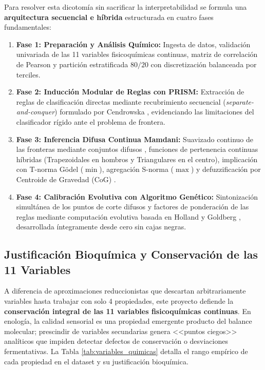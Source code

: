 \documentclass{article}
\begin{document}
Para resolver esta dicotomía sin sacrificar la interpretabilidad se formula una \textbf{arquitectura secuencial e híbrida} estructurada en cuatro fases fundamentales:
\begin{enumerate}
    \item \textbf{Fase 1: Preparación y Análisis Químico:} Ingesta de datos, validación univariada de las 11 variables fisicoquímicas continuas, matriz de correlación de Pearson y partición estratificada $80/20$ con discretización balanceada por terciles.
    \item \textbf{Fase 2: Inducción Modular de Reglas con PRISM:} Extracción de reglas de clasificación directas mediante recubrimiento secuencial (\textit{separate-and-conquer}) formulado por Cendrowska \cite{cendrowska1987prism}, evidenciando las limitaciones del clasificador rígido ante el problema de frontera.
    \item \textbf{Fase 3: Inferencia Difusa Continua Mamdani:} Suavizado continuo de las fronteras mediante conjuntos difusos \cite{zadeh1965fuzzy}, funciones de pertenencia continuas híbridas (Trapezoidales en hombros y Triangulares en el centro), implicación con T-norma Gödel ($\min$), agregación S-norma ($\max$) y defuzzificación por Centroide de Gravedad (CoG) \cite{mamdani1975experiment}.
    \item \textbf{Fase 4: Calibración Evolutiva con Algoritmo Genético:} Sintonización simultánea de los puntos de corte difusos y factores de ponderación de las reglas mediante computación evolutiva basada en Holland \cite{holland1975adaptation} y Goldberg \cite{goldberg1989genetic}, desarrollada íntegramente desde cero sin cajas negras.
\end{enumerate}

\subsection{Justificación Bioquímica y Conservación de las 11 Variables}

A diferencia de aproximaciones reduccionistas que descartan arbitrariamente variables hasta trabajar con solo 4 propiedades, este proyecto defiende la \textbf{conservación integral de las 11 variables fisicoquímicas continuas}. En enología, la calidad sensorial es una propiedad emergente producto del balance molecular; prescindir de variables secundarias genera <<puntos ciegos>> analíticos que impiden detectar defectos de conservación o desviaciones fermentativas. La Tabla \ref{tab:variables_quimicas} detalla el rango empírico de cada propiedad en el dataset y su justificación bioquímica.
\end{document}
